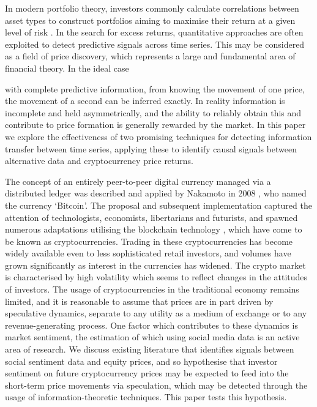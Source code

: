\documentclass[]{rsos}%
\begin{document}
  In modern portfolio theory, investors commonly calculate correlations between asset types to construct portfolios aiming to maximise their return at a given level of risk \cite{markowitz1952portfolio}. In the search for excess returns, quantitative approaches are often exploited to detect predictive signals across time series. This may be considered as a field of price discovery, which represents a large and fundamental area of financial theory. In the ideal case {with complete predictive information, from knowing the movement of one price, the movement of a second can be inferred exactly. In reality information is incomplete and held asymmetrically, and the ability to reliably obtain this and contribute to price formation is generally rewarded by the market. In this paper we explore the effectiveness of two promising techniques for detecting information transfer between time series, applying these to identify causal signals between alternative data and cryptocurrency price returns. 

  The concept of an entirely peer-to-peer digital currency managed via a distributed ledger was described and applied by Nakamoto in 2008 \cite{nakamoto2008bitcoin}, who named the currency `Bitcoin'. The proposal and subsequent implementation captured the attention of technologists, economists, libertarians and futurists, and spawned numerous adaptations utilising the blockchain technology \cite{aste2017blockchain}, which have come to be known as cryptocurrencies. Trading in these cryptocurrencies has become widely available even to less sophisticated retail investors, and volumes have grown significantly as interest in the currencies has widened. The crypto market is characterised by high volatility which seems to reflect changes in the attitudes of investors. The usage of cryptocurrencies in the traditional economy remains limited, and it is reasonable to assume that prices are in part driven by speculative dynamics, separate to any utility as a medium of exchange or to any revenue-generating process.  
  One factor which contributes to these dynamics is market sentiment, the estimation of which using social media data is an active area of research.  We discuss existing literature that identifies signals between social sentiment data and equity prices, and so hypothesise that investor sentiment on future cryptocurrency prices may be expected to feed into the short-term price movements via speculation, which may be detected through the usage of information-theoretic techniques. This paper tests this hypothesis. 

}
\end{document}
